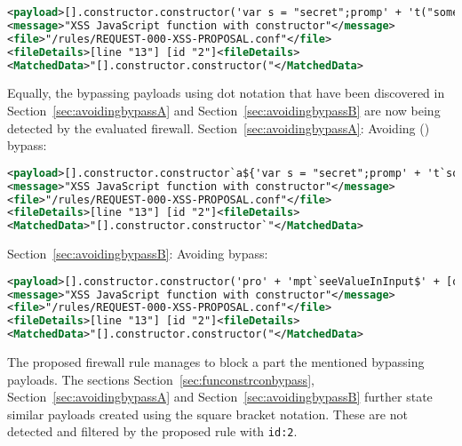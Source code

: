 \begin{lstlisting}[style=ruleStyle, language=XML, caption=function constructor bypass payload using dot notation blocked, label={lst:constructorsblockedpoc}]
<payload>[].constructor.constructor('var s = "secret";promp' + 't("something", s)')()</payload>
<message>"XSS JavaScript function with constructor"</message>
<file>"/rules/REQUEST-000-XSS-PROPOSAL.conf"</file>
<fileDetails>[line "13"] [id "2"]<fileDetails>
<MatchedData>"[].constructor.constructor("</MatchedData>
\end{lstlisting}

Equally, the bypassing payloads using dot notation that have been discovered in Section~\ref{sec:avoidingbypassA} and  Section~\ref{sec:avoidingbypassB} are now being detected by the evaluated firewall. Section~\ref{sec:avoidingbypassA}: Avoiding () bypass:

\begin{lstlisting}[style=ruleStyle, language=XML, caption=avoiding () bypass payload using dot notation blocked, label={lst:constructorsblockedpoc}]
<payload>[].constructor.constructor`a${'var s = "secret";promp' + 't`something\u{0024}{s}`'}```</payload>
<message>"XSS JavaScript function with constructor"</message>
<file>"/rules/REQUEST-000-XSS-PROPOSAL.conf"</file>
<fileDetails>[line "13"] [id "2"]<fileDetails>
<MatchedData>"[].constructor.constructor`"</MatchedData>
\end{lstlisting}

Section~\ref{sec:avoidingbypassB}: Avoiding {} bypass:

\begin{lstlisting}[style=ruleStyle, language=XML, caption=using constructors rule poc, label={lst:constructorsblockedpoc}]
<payload>[].constructor.constructor('pro' + 'mpt`seeValueInInput$' + [open + []][0][16] + '2+2' + [open + []][0][36] + ':`')();</payload>
<message>"XSS JavaScript function with constructor"</message>
<file>"/rules/REQUEST-000-XSS-PROPOSAL.conf"</file>
<fileDetails>[line "13"] [id "2"]<fileDetails>
<MatchedData>"[].constructor.constructor("</MatchedData>
\end{lstlisting}

The proposed firewall rule manages to block a part the mentioned bypassing payloads. The sections Section~\ref{sec:funconstrconbypass}, Section~\ref{sec:avoidingbypassA} and Section~\ref{sec:avoidingbypassB} further state similar payloads created using the square bracket notation. These are not detected and filtered by the proposed rule with \verb|id:2|.

